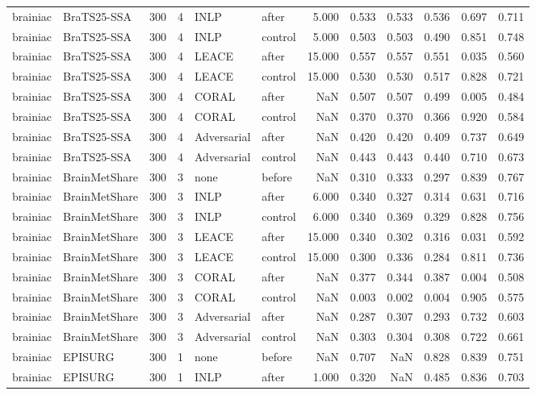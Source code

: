 \begin{tabular}{llrrllrrrrrr}
brainiac & BraTS25-SSA & 300 & 4 & INLP & after & 5.000 & 0.533 & 0.533 & 0.536 & 0.697 & 0.711 \\
brainiac & BraTS25-SSA & 300 & 4 & INLP & control & 5.000 & 0.503 & 0.503 & 0.490 & 0.851 & 0.748 \\
brainiac & BraTS25-SSA & 300 & 4 & LEACE & after & 15.000 & 0.557 & 0.557 & 0.551 & 0.035 & 0.560 \\
brainiac & BraTS25-SSA & 300 & 4 & LEACE & control & 15.000 & 0.530 & 0.530 & 0.517 & 0.828 & 0.721 \\
brainiac & BraTS25-SSA & 300 & 4 & CORAL & after & NaN & 0.507 & 0.507 & 0.499 & 0.005 & 0.484 \\
brainiac & BraTS25-SSA & 300 & 4 & CORAL & control & NaN & 0.370 & 0.370 & 0.366 & 0.920 & 0.584 \\
brainiac & BraTS25-SSA & 300 & 4 & Adversarial & after & NaN & 0.420 & 0.420 & 0.409 & 0.737 & 0.649 \\
brainiac & BraTS25-SSA & 300 & 4 & Adversarial & control & NaN & 0.443 & 0.443 & 0.440 & 0.710 & 0.673 \\
brainiac & BrainMetShare & 300 & 3 & none & before & NaN & 0.310 & 0.333 & 0.297 & 0.839 & 0.767 \\
brainiac & BrainMetShare & 300 & 3 & INLP & after & 6.000 & 0.340 & 0.327 & 0.314 & 0.631 & 0.716 \\
brainiac & BrainMetShare & 300 & 3 & INLP & control & 6.000 & 0.340 & 0.369 & 0.329 & 0.828 & 0.756 \\
brainiac & BrainMetShare & 300 & 3 & LEACE & after & 15.000 & 0.340 & 0.302 & 0.316 & 0.031 & 0.592 \\
brainiac & BrainMetShare & 300 & 3 & LEACE & control & 15.000 & 0.300 & 0.336 & 0.284 & 0.811 & 0.736 \\
brainiac & BrainMetShare & 300 & 3 & CORAL & after & NaN & 0.377 & 0.344 & 0.387 & 0.004 & 0.508 \\
brainiac & BrainMetShare & 300 & 3 & CORAL & control & NaN & 0.003 & 0.002 & 0.004 & 0.905 & 0.575 \\
brainiac & BrainMetShare & 300 & 3 & Adversarial & after & NaN & 0.287 & 0.307 & 0.293 & 0.732 & 0.603 \\
brainiac & BrainMetShare & 300 & 3 & Adversarial & control & NaN & 0.303 & 0.304 & 0.308 & 0.722 & 0.661 \\
brainiac & EPISURG & 300 & 1 & none & before & NaN & 0.707 & NaN & 0.828 & 0.839 & 0.751 \\
brainiac & EPISURG & 300 & 1 & INLP & after & 1.000 & 0.320 & NaN & 0.485 & 0.836 & 0.703 \\

\end{tabular}
